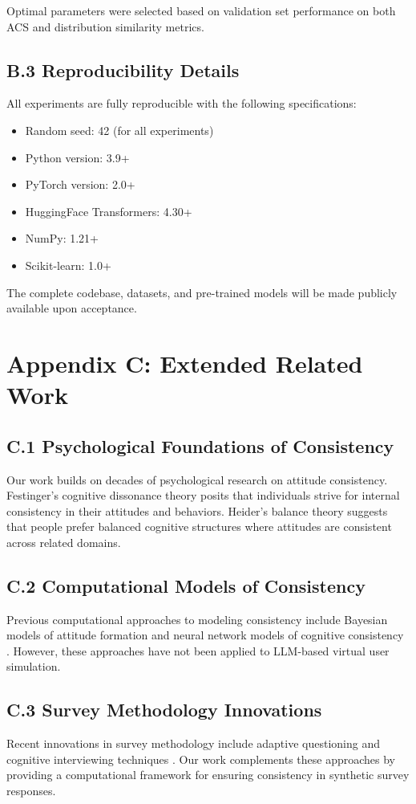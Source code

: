 \documentclass[sigconf, anonymous]{acmart}
\begin{document}
Optimal parameters were selected based on validation set performance on both ACS and distribution similarity metrics.

\subsection*{B.3 Reproducibility Details}

All experiments are fully reproducible with the following specifications:

\begin{itemize}
    \item Random seed: 42 (for all experiments)
    \item Python version: 3.9+
    \item PyTorch version: 2.0+
    \item HuggingFace Transformers: 4.30+
    \item NumPy: 1.21+
    \item Scikit-learn: 1.0+
\end{itemize}

The complete codebase, datasets, and pre-trained models will be made publicly available upon acceptance.

\newpage
\section*{Appendix C: Extended Related Work}

\subsection*{C.1 Psychological Foundations of Consistency}

Our work builds on decades of psychological research on attitude consistency. Festinger's cognitive dissonance theory \cite{festinger1957theory} posits that individuals strive for internal consistency in their attitudes and behaviors. Heider's balance theory \cite{heider1958psychology} suggests that people prefer balanced cognitive structures where attitudes are consistent across related domains.

\subsection*{C.2 Computational Models of Consistency}

Previous computational approaches to modeling consistency include Bayesian models of attitude formation \cite{rozenblit2001biases} and neural network models of cognitive consistency \cite{read1997neural}. However, these approaches have not been applied to LLM-based virtual user simulation.

\subsection*{C.3 Survey Methodology Innovations}

Recent innovations in survey methodology include adaptive questioning \cite{kaplan2010adaptive} and cognitive interviewing techniques \cite{willis2005cognitive}. Our work complements these approaches by providing a computational framework for ensuring consistency in synthetic survey responses.
\end{document}
